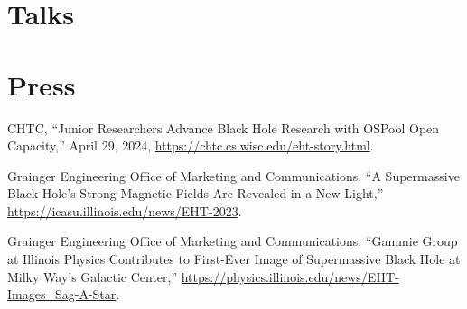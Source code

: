 \documentclass[11pt]{article}
\begin{document}
\ifdefined\withtalks{}
\section*{Talks}

\else\fi

\ifdefined\withpress{}
\section*{Press}
CHTC, “Junior Researchers Advance Black Hole Research with OSPool Open Capacity,” April 29, 2024, \href{https://chtc.cs.wisc.edu/eht-story.html}{https://chtc.cs.wisc.edu/eht-story.html}.

Grainger Engineering Office of Marketing and Communications, “A Supermassive Black Hole’s Strong Magnetic Fields Are Revealed in a New Light,” \href{https://icasu.illinois.edu/news/EHT-2023}{https://icasu.illinois.edu/news/EHT-2023}.

Grainger Engineering Office of Marketing and Communications, “Gammie Group at Illinois Physics Contributes to First-Ever Image of Supermassive Black Hole at Milky Way’s Galactic Center,” \href{https://physics.illinois.edu/news/EHT-Images\_Sag-A-Star}{https://physics.illinois.edu/news/EHT-Images\_Sag-A-Star}.
\else\fi
\end{document}
